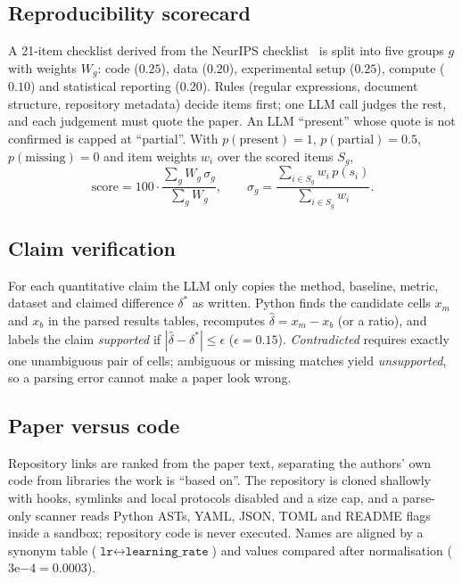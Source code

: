 \documentclass[conference]{IEEEtran}
\begin{document}
\subsection{Reproducibility scorecard}
A 21-item checklist derived from the NeurIPS checklist~\cite{pineau2021improving} is split
into five groups $g$ with weights $W_g$: code ($0.25$), data ($0.20$), experimental setup
($0.25$), compute ($0.10$) and statistical reporting ($0.20$). Rules (regular expressions,
document structure, repository metadata) decide items first; one LLM call judges the rest,
and each judgement must quote the paper. An LLM ``present'' whose quote is not confirmed
is capped at ``partial''. With $p(\text{present})=1$, $p(\text{partial})=0.5$,
$p(\text{missing})=0$ and item weights $w_i$ over the scored items $S_g$,
\begin{equation}
  \text{score} = 100 \cdot \frac{\sum_g W_g\, \sigma_g}{\sum_g W_g}, \qquad
  \sigma_g = \frac{\sum_{i\in S_g} w_i\, p(s_i)}{\sum_{i\in S_g} w_i}.
\end{equation}

\subsection{Claim verification}
For each quantitative claim the LLM only copies the method, baseline, metric, dataset and
claimed difference $\delta^{*}$ as written. Python finds the candidate cells $x_m$ and $x_b$
in the parsed results tables, recomputes $\hat\delta = x_m - x_b$ (or a ratio), and labels
the claim \emph{supported} if $|\hat\delta - \delta^{*}| \leq \epsilon$ ($\epsilon=0.15$).
\emph{Contradicted} requires exactly one unambiguous pair of cells; ambiguous or missing
matches yield \emph{unsupported}, so a parsing error cannot make a paper look wrong.

\subsection{Paper versus code}
Repository links are ranked from the paper text, separating the authors' own code from
libraries the work is ``based on''. The repository is cloned shallowly with hooks, symlinks
and local protocols disabled and a size cap, and a parse-only scanner reads Python ASTs,
YAML, JSON, TOML and README flags inside a sandbox; repository code is never executed.
Names are aligned by a synonym table ($\texttt{lr} \leftrightarrow
\texttt{learning\_rate}$) and values compared after normalisation ($3\mathrm{e}{-4} =
0.0003$).
\end{document}
